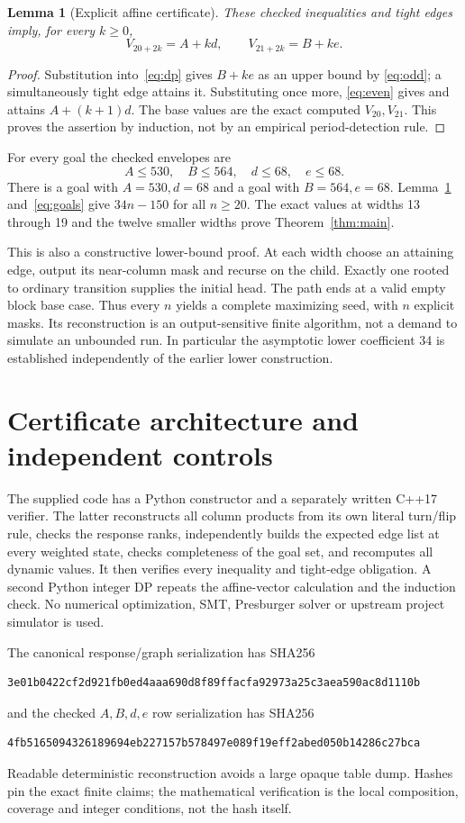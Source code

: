 \documentclass[11pt]{article}
\newtheorem{lemma}[theorem]{Lemma}
\theoremstyle{definition}\newtheorem{definition}[theorem]{Definition}
\begin{document}
\begin{lemma}[Explicit affine certificate]\label{lem:affine}
These checked inequalities and tight edges imply, for every $k\ge0$,
\[
 V_{20+2k}=A+kd,\qquad V_{21+2k}=B+ke.
\]
\end{lemma}
\begin{proof}
Substitution into~\eqref{eq:dp} gives $B+ke$ as an upper bound by
\eqref{eq:odd}; a simultaneously tight edge attains it. Substituting once more,
\eqref{eq:even} gives and attains $A+(k+1)d$. The base values are the exact
computed $V_{20},V_{21}$. This proves the assertion by induction, not by an
empirical period-detection rule.
\end{proof}

For every goal the checked envelopes are
\[
 A\le530,\quad B\le564,\quad d\le68,\quad e\le68.
\]
There is a goal with $A=530,d=68$ and a goal with $B=564,e=68$.
Lemma~\ref{lem:affine} and~\eqref{eq:goals} give $34n-150$ for all $n\ge20$.
The exact values at widths 13 through 19 and the twelve smaller widths prove
Theorem~\ref{thm:main}.

This is also a constructive lower-bound proof. At each width choose an attaining
edge, output its near-column mask and recurse on the child. Exactly one rooted
to ordinary transition supplies the initial head. The path ends at a valid empty
block base case. Thus every $n$ yields a complete maximizing seed, with $n$
explicit masks. Its reconstruction is an output-sensitive finite algorithm,
not a demand to simulate an unbounded run. In particular the asymptotic lower
coefficient 34 is established independently of the earlier lower construction.

\section{Certificate architecture and independent controls}
The supplied code has a Python constructor and a separately written C++17
verifier. The latter reconstructs all column products from its own literal
turn/flip rule, checks the response ranks, independently builds the expected
edge list at every weighted state, checks completeness of the goal set, and
recomputes all dynamic values. It then verifies every inequality and tight-edge
obligation. A second Python integer DP repeats the affine-vector calculation
and the induction check. No numerical optimization, SMT, Presburger solver or
upstream project simulator is used.

The canonical response/graph serialization has SHA256
\begin{Verbatim}[fontsize=\small]
3e01b0422cf2d921fb0ed4aaa690d8f89ffacfa92973a25c3aea590ac8d1110b
\end{Verbatim}
and the checked $A,B,d,e$ row serialization has SHA256
\begin{Verbatim}[fontsize=\small]
4fb5165094326189694eb227157b578497e089f19eff2abed050b14286c27bca
\end{Verbatim}
Readable deterministic reconstruction avoids a large opaque table dump. Hashes
pin the exact finite claims; the mathematical verification is the local
composition, coverage and integer conditions, not the hash itself.
\end{document}
